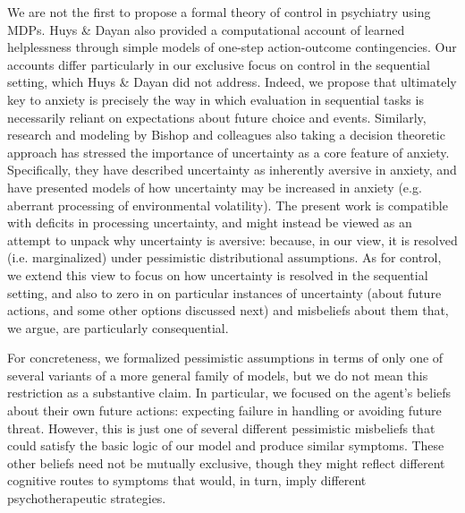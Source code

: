 \documentclass[11pt]{article} %
\begin{document}
We are not the first to propose a formal theory of control in psychiatry using MDPs. Huys \& Dayan \cite{HuysDayan2009} also provided a computational account of learned helplessness through simple models of one-step action-outcome contingencies. Our accounts differ particularly in our exclusive focus on control in the sequential setting, which Huys \& Dayan did not address. Indeed, we propose that ultimately key to anxiety is precisely the way in which evaluation in sequential tasks is necessarily reliant on expectations about future choice and events. Similarly, research and modeling by Bishop and colleagues \citep{browning2015, gagne2018} also taking a decision theoretic approach has stressed the importance of uncertainty as a core feature of anxiety. Specifically, they have described uncertainty as inherently aversive in anxiety, and have presented models of how uncertainty may be increased in anxiety (e.g. aberrant processing of environmental volatility). The present work is compatible with deficits in processing uncertainty, and might instead be viewed as an attempt to unpack why uncertainty is aversive: because, in our view, it is resolved (i.e. marginalized) under pessimistic distributional assumptions. As for control, we extend this view to focus on how uncertainty is resolved in the sequential setting, and also to zero in on particular instances of uncertainty (about future actions, and some other options discussed next) and misbeliefs about them that, we argue, are particularly consequential.

For concreteness, we formalized pessimistic assumptions in terms of only one of several variants of a more general family of models, but we do not mean this restriction as a substantive claim. In particular, we focused on the agent's beliefs about their own future actions: expecting failure in handling or avoiding future threat. However, this is just one of several different pessimistic misbeliefs that could satisfy the basic logic of our model and produce similar symptoms. These other beliefs need not be mutually exclusive, though they might reflect different cognitive routes to symptoms that would, in turn, imply different psychotherapeutic strategies.
\end{document}
